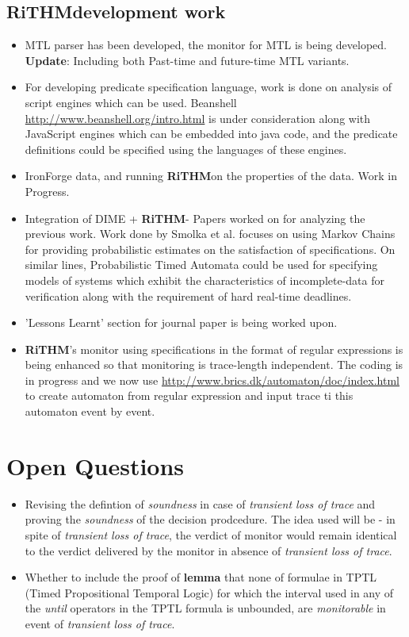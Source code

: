 \documentclass[]{article}
\newcommand{\rithm}{\textbf{RiTHM}\space}
\newcommand{\tloss}{\emph{transient loss of trace}}
\begin{document}
	\subsection{\rithm development work}
	\begin{itemize}
	\item MTL parser has been developed, the monitor for MTL is being developed. \textbf{Update}: Including both Past-time and future-time MTL variants. 
	\item For developing predicate specification language, work is done on analysis of script engines which can be used. Beanshell \url{http://www.beanshell.org/intro.html} is under consideration along with JavaScript engines which can be embedded into java code, and the predicate definitions could be specified using the languages of these engines.
	
	\item IronForge data, and running \rithm on the properties of the data. Work in Progress.
	
	\item Integration of DIME + \rithm - Papers worked on for analyzing the previous work. Work done by Smolka et al. focuses on using Markov Chains for providing probabilistic estimates on the satisfaction of specifications. On similar lines, Probabilistic Timed Automata could be used for specifying 
	models of systems which exhibit the characteristics of incomplete-data for verification along with the requirement of hard real-time deadlines.
	\item 'Lessons Learnt' section for journal paper is being worked upon.
	
	\item \rithm's monitor using specifications in the format of regular expressions is being enhanced so that monitoring is trace-length independent. The coding is in progress and we now use \url{http://www.brics.dk/automaton/doc/index.html} to create automaton from regular expression and input trace ti this automaton event by event. 
	

	\end{itemize}

\section{Open Questions}
	\begin{itemize}
	\item Revising the defintion of \emph{soundness} in case of \tloss{} and proving the \emph{soundness} of the decision prodcedure. The idea used will be  - in spite of \tloss{}, the verdict of monitor would remain identical to the verdict delivered by the monitor in absence of \tloss{}. 
	
	\item Whether to include the proof of \textbf{lemma} that none of formulae in TPTL (Timed Propositional Temporal Logic) for which the interval used in any of the \emph{until} operators in the TPTL formula is unbounded, are \emph{monitorable} in event of \tloss. 	 
	\end{itemize}
\end{document}
